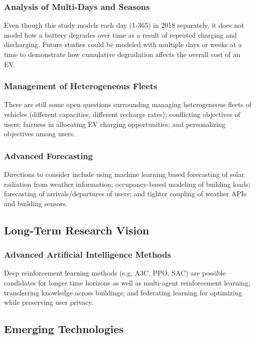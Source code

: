 \subsubsection{Analysis of Multi-Days and Seasons}

Even though this study models each day (1-365) in 2018 separately, it does not model how a battery degrades over time as a result of repeated charging and discharging. Future studies could be modeled with multiple days or weeks at a time to demonstrate how cumulative degradation affects the overall cost of an EV.
\subsubsection{Management of Heterogeneous Fleets}

There are still some open questions surrounding managing heterogeneous fleets of vehicles (different capacities, different recharge rates); conflicting objectives of users; fairness in allocating EV charging opportunities; and personalizing objectives among users.

\subsubsection{Advanced Forecasting}

Directions to consider include using machine learning based forecasting of solar radiation from weather information; occupancy-based modeling of building loads; forecasting of arrivals/departures of users; and tighter coupling of weather APIs and building sensors.

\subsection{Long-Term Research Vision}
\label{subsec:long_term}

\subsubsection{Advanced Artificial Intelligence Methods}

Deep reinforcement learning methods (e.g. A3C, PPO, SAC) are possible candidates for longer time horizons as well as multi-agent reinforcement learning; transferring knowledge across buildings; and federating learning for optimizing while preserving user privacy.

\subsection{Emerging Technologies}
\label{subsec:emerging_tech}

